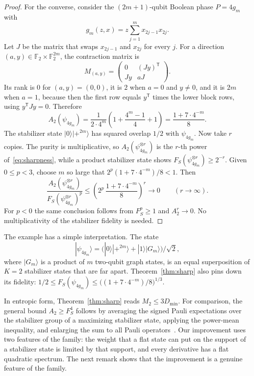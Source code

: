\documentclass[a4paper,onecolumn,11pt,unpublished]{quantumarticle}
\theoremstyle{plain}
\theoremstyle{remark}
\newcommand{\F}{\mathbb{F}_2}
\newcommand{\ket}[1]{|#1\rangle}
\newcommand{\T}{\mathsf{T}}
\begin{document}
\begin{proof}
For the converse, consider the $(2m+1)$-qubit Boolean phase $P=4g_m$ with
\[
g_m(z,x)=z\sum_{j=1}^m x_{2j-1}x_{2j}.
\]
Let $J$ be the matrix that swaps $x_{2j-1}$ and $x_{2j}$ for every $j$. For a direction $(a,y)\in\F\times\F^{2m}$, the contraction matrix is
\[
M_{(a,y)}=\begin{pmatrix}0&(Jy)^\T\\ Jy&aJ\end{pmatrix}.
\]
Its rank is $0$ for $(a,y)=(0,0)$, it is $2$ when $a=0$ and $y\neq0$, and it is $2m$ when $a=1$, because then the first row equals $y^\T$ times the lower block rows, using $y^\T Jy=0$. Therefore
\begin{equation}\label{eq:sharpness}
A_2(\psi_{4g_m})=\frac{1}{2\cdot4^m}\left(1+\frac{4^m-1}{4}+1\right)=\frac{1+7\cdot4^{-m}}{8}.
\end{equation}
The stabilizer state $\ket{0}\ket{+^{2m}}$ has squared overlap $1/2$ with $\psi_{4g_m}$. Now take $r$ copies. The purity is multiplicative, so $A_2(\psi_{4g_m}^{\otimes r})$ is the $r$-th power of~\eqref{eq:sharpness}, while a product stabilizer state shows $F_S(\psi_{4g_m}^{\otimes r})\ge2^{-r}$. Given $0\le p<3$, choose $m$ so large that $2^p(1+7\cdot4^{-m})/8<1$. Then
\[
\frac{A_2(\psi_{4g_m}^{\otimes r})}{F_S(\psi_{4g_m}^{\otimes r})^p}\le\left(2^p\,\frac{1+7\cdot4^{-m}}{8}\right)^r\longrightarrow0\qquad(r\to\infty).
\]
For $p<0$ the same conclusion follows from $F_S^p\ge1$ and $A_2^r\to0$. No multiplicativity of the stabilizer fidelity is needed.
\end{proof}

The example has a simple interpretation. The state
\[
\ket{\psi_{4g_m}}=\big(\ket{0}\ket{+^{2m}}+\ket{1}\ket{G_m}\big)/\sqrt2,
\]
where $\ket{G_m}$ is a product of $m$ two-qubit graph states, is an equal superposition of $K=2$ stabilizer states that are far apart. Theorem~\ref{thm:sharp} also pins down its fidelity: $1/2\le F_S(\psi_{4g_m})\le\big((1+7\cdot4^{-m})/8\big)^{1/3}$.

In entropic form, Theorem~\ref{thm:sharp} reads $M_2\le3D_{\min}$. For comparison, the general bound $A_2\ge F_S^4$ follows by averaging the signed Pauli expectations over the stabilizer group of a maximizing stabilizer state, applying the power-mean inequality, and enlarging the sum to all Pauli operators~\cite{HLK24,TFH25}. Our improvement uses two features of the family: the weight that a flat state can put on the support of a stabilizer state is limited by that support, and every derivative has a flat quadratic spectrum. The next remark shows that the improvement is a genuine feature of the family.
\end{document}
